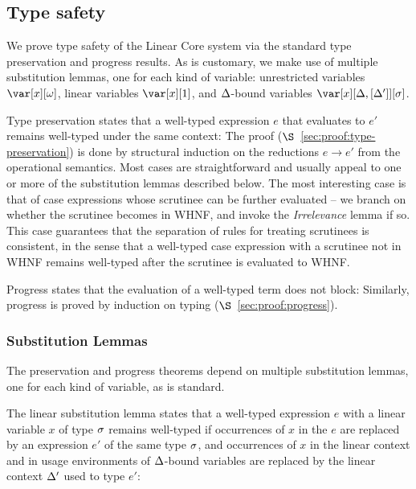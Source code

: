 \documentclass[acmsmall, screen, review]{acmart}
\begin{document}
\subsection{Type safety\label{sec:type-safety-meta}}

We prove type safety of the Linear Core system via the standard type
preservation and progress results. As is customary, we make use of multiple
substitution lemmas, one for each kind of variable: unrestricted variables
$\xo$, linear variables $\xl$, and $\Delta$-bound variables $\xD$.


\TypePreservationTheorem
%
\noindent Type preservation states that a well-typed expression $e$ that
evaluates to $e'$ remains well-typed under the same context:
%
The proof ($\S$~\ref{sec:proof:type-preservation}) is done by structural induction on the reductions $e \longrightarrow
e'$ from the operational semantics. Most cases are straightforward and usually
appeal to one or more of the substitution lemmas described below. The most
interesting case is that of case expressions whose scrutinee can be further
evaluated -- we branch on whether the scrutinee becomes in WHNF, and invoke the
\emph{Irrelevance} lemma if so.
%
This case guarantees that the separation of rules for treating scrutinees is
consistent, in the sense that a well-typed case expression with a scrutinee not
in WHNF remains well-typed after the scrutinee is evaluated to WHNF.

\ProgressTheorem
%
\noindent Progress states that the evaluation of a well-typed term does not block:
Similarly, progress is proved by induction on typing ($\S$~\ref{sec:proof:progress}).

\subsubsection{Substitution Lemmas}

The preservation and progress theorems depend on multiple substitution lemmas,
one for each kind of variable, as is standard.


The linear substitution lemma states that a well-typed expression $e$ with a
linear variable $x$ of type $\sigma$ remains well-typed if
occurrences of $x$ in the $e$ are replaced by an expression $e'$ of the same
type $\sigma$, and occurrences of $x$ in the linear context and in usage
environments of $\Delta$-bound variables are replaced by the linear context $\Delta'$
used to type $e'$:
\end{document}
